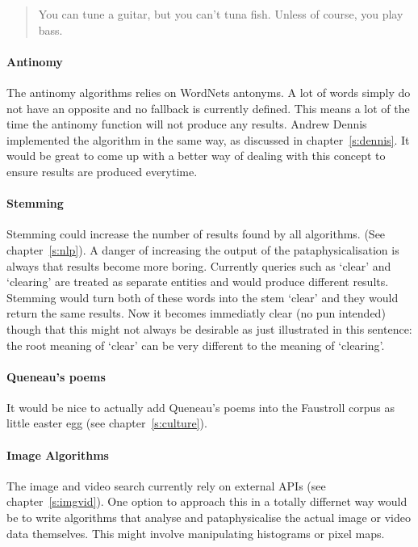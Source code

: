 \begin{quotation}
   You can tune a guitar, but you can't tuna fish. Unless of course, you play bass. 
\end{quotation}

\paragraph{Antinomy}
The antinomy algorithms relies on WordNets antonyms. A lot of words simply do not have an opposite and no fallback is currently defined. This means a lot of the time the antinomy function will not produce any results. Andrew Dennis implemented the algorithm in the same way, as discussed in chapter~\ref{s:dennis}. It would be great to come up with a better way of dealing with this concept to ensure results are produced everytime.

\paragraph{Stemming}
Stemming could increase the number of results found by all algorithms. (See chapter~\ref{s:nlp}). A danger of increasing the output of the pataphysicalisation is always that results become more boring. Currently queries such as `clear' and `clearing' are treated as separate entities and would produce different results. Stemming would turn both of these words into the stem `clear' and they would return the same results. Now it becomes immediatly clear (no pun intended) though that this might not always be desirable as just illustrated in this sentence: the root meaning of `clear' can be very different to the meaning of `clearing'.

\paragraph{Queneau's poems}
It would be nice to actually add Queneau's poems \autocite{Queneau1961} into the Faustroll corpus as little easter egg (see chapter~\ref{s:culture}).

\paragraph{Image Algorithms}
The image and video search currently rely on external \ac{API}s (see chapter~\ref{s:imgvid}). One option to approach this in a totally differnet way would be to write algorithms that analyse and pataphysicalise the actual image or video data themselves. This might involve manipulating histograms or pixel maps.


